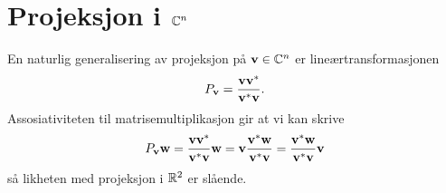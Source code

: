  \section*{Projeksjon i $\mathbb{C}^n$}
% 
% 
% 
% 
%
% 
%
%
%
%
%
 
En naturlig generalisering av  projeksjon på $\mathbf{v} \in \mathbb{C}^n$ er lineærtransformasjonen
 \[
 P_{\mathbf{v}}=\frac{\mathbf{v} \mathbf{v}^*}{\mathbf{v}^* \mathbf{v}}.
 \]
Assosiativiteten til matrisemultiplikasjon gir at vi kan skrive
 \[
 P_{\mathbf{v}}\mathbf{w}=\frac{\mathbf{v} \mathbf{v}^*}{\mathbf{v}^* \mathbf{v}} \mathbf{w}=\mathbf{v} \frac{ \mathbf{v}^*\mathbf{w}}{\mathbf{v}^* \mathbf{v}}=\frac{ \mathbf{v}^*\mathbf{w}}{\mathbf{v}^* \mathbf{v}} \mathbf{v} 
 \]
 så likheten med projeksjon i $\mathbb{R}^2$ er slående. %

